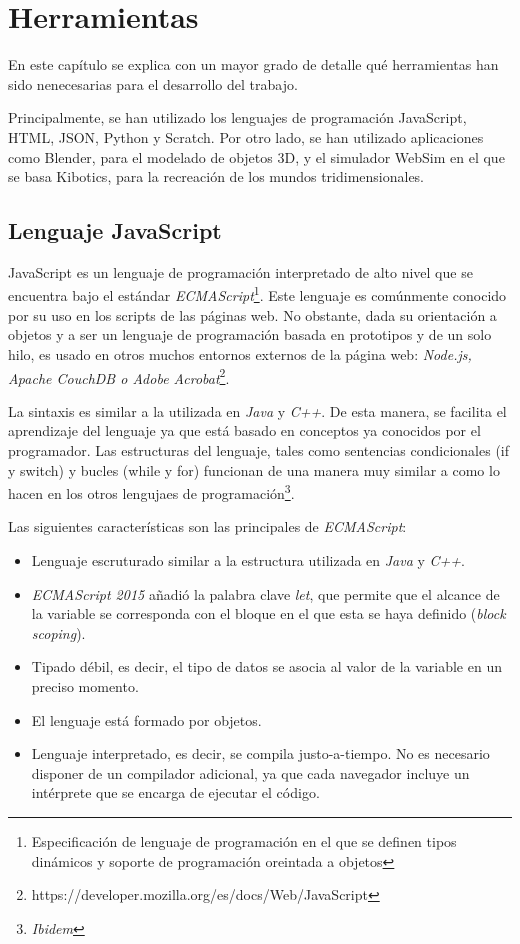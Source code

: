 \chapter{Herramientas}
\label{chap:herramientas} 
En este capítulo se explica con un mayor grado de detalle qué herramientas han sido nenecesarias para el desarrollo del trabajo. \newline

Principalmente, se han utilizado los lenguajes de programación JavaScript, HTML, JSON, Python y Scratch. Por otro lado, se han utilizado aplicaciones como Blender, para el modelado de objetos 3D, y el simulador WebSim en el que se basa Kibotics, para la recreación de los mundos tridimensionales.
   
\section{Lenguaje JavaScript}
JavaScript es un lenguaje de programación interpretado de alto nivel que se encuentra bajo el estándar \textit{ECMAScript}\footnote{Especificación de lenguaje de programación en el que se definen tipos dinámicos y soporte de programación oreintada a objetos}. Este lenguaje es comúnmente conocido por su uso en los scripts de las páginas web. No obstante, dada su orientación a objetos y a ser un lenguaje de programación basada en prototipos y de un solo hilo, es usado en otros muchos entornos externos de la página web: \textit{Node.js, Apache CouchDB o Adobe Acrobat}\footnote{https://developer.mozilla.org/es/docs/Web/JavaScript}. \newline

La sintaxis es similar a la utilizada en \textit{Java} y \textit{C++}. De esta manera, se facilita el aprendizaje del lenguaje ya que está basado en conceptos ya conocidos por el programador. Las estructuras del lenguaje, tales como sentencias condicionales (if y switch) y bucles (while y for) funcionan de una manera muy similar a como lo hacen en los otros lengujaes de programación\footnote{\textit{Ibidem}}. \newline

Las siguientes características son las principales de \textit{ECMAScript}:
\begin{itemize}
    \item Lenguaje escruturado similar a la estructura utilizada en \textit{Java} y \textit{C++}.
    \item \textit{ECMAScript 2015} añadió la palabra clave \textit{let}, que permite que el alcance de la variable se corresponda con el bloque en el que esta se haya definido (\textit{block scoping}).
    \item Tipado débil, es decir, el tipo de datos se asocia al valor de la variable en un preciso momento.
    \item El lenguaje está formado por objetos.
    \item Lenguaje interpretado, es decir, se compila justo-a-tiempo. No es necesario disponer de un compilador adicional, ya que cada navegador incluye un intérprete que se encarga de ejecutar el código.
\end{itemize}

